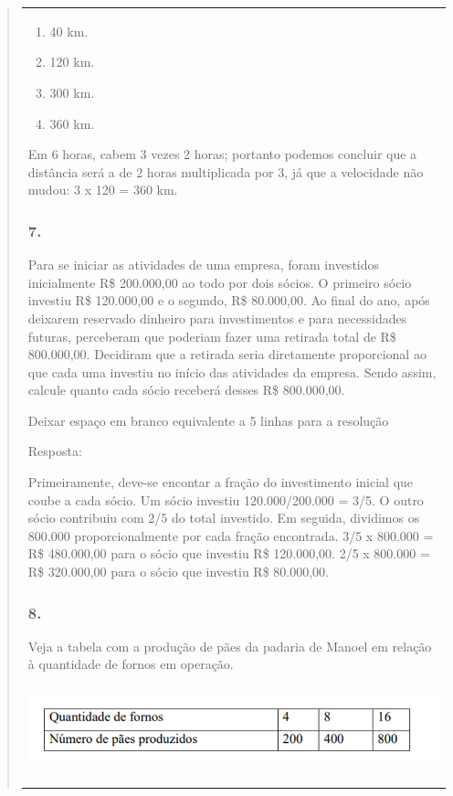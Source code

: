 \begin{enumerate}
\begin{escolha}
\begin{enumerate}
\begin{itemize}
\begin{itemize}
\begin{escolha}
\begin{quote}
\begin{escolha}
{\begin{longtable}[]{@{}l@{}}
\begin{itemize}
\begin{enumerate}
\def\labelenumi{\alph{enumi})}
\item
  40 km.
\item
  120 km.
\item
  300 km.
\item
  360 km.
\end{enumerate}

Em 6 horas, cabem 3 vezes 2 horas; portanto podemos concluir que a
distância será a de 2 horas multiplicada por 3, já que a velocidade não
mudou: 3 x 120 = 360 km.

\subsubsection{7.}\label{section-123}

Para se iniciar as atividades de uma empresa, foram investidos
inicialmente R\$ 200.000,00 ao todo por dois sócios. O primeiro
sócio investiu R\$ 120.000,00 e o segundo, R\$ 80.000,00. Ao final do ano,
após deixarem reservado dinheiro para investimentos e para necessidades
futuras, perceberam que poderiam fazer uma retirada total de R\$ 800.000,00. Decidiram que a retirada seria diretamente proporcional ao que
cada uma investiu no início das atividades da empresa. Sendo assim,
calcule quanto cada sócio receberá desses R\$ 800.000,00.

Deixar espaço em branco equivalente a 5 linhas para a resolução

Resposta:

Primeiramente, deve-se encontar a fração do investimento inicial que
coube a cada sócio.
Um sócio investiu 120.000/200.000 = 3/5.
O outro sócio contribuiu com 2/5 do total investido.
Em seguida, dividimos os 800.000 proporcionalmente por cada fração encontrada.
3/5 x 800.000 = R\$ 480.000,00 para o sócio que investiu R\$ 120.000,00.
2/5 x 800.000 = R\$ 320.000,00 para o sócio que investiu R\$ 80.000,00.

\subsubsection{8.}\label{section-124}

Veja a tabela com a produção de pães da padaria de Manoel em
relação à quantidade de fornos em operação.


\includegraphics[width=5.90556in,height=0.92222in]{media/image131.png}


\end{itemize}
\end{longtable}}
\end{escolha}
\end{quote}
\end{escolha}
\end{itemize}
\end{itemize}
\end{enumerate}
\end{escolha}
\end{enumerate}
